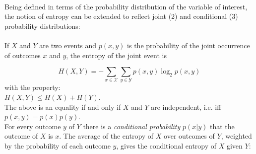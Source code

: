 \documentclass[12pt]{extarticle}
\begin{document}
\noindent \\ Being defined in terms of the probability distribution of the variable of interest, the notion of entropy can be extended to reflect joint (2) and conditional (3) probability distributions:\\ \\
If $X$ and $Y$ are two events and $p(x,y)$ is the probability of the joint occurrence of outcomes $x$ and $y$, the entropy of the joint event is

\begin{equation}
H(X,Y)=-\sum_{x \in \mathcal{X}}\sum_{y \in\mathcal{Y}} p(x,y)\log_2 p(x,y)
\end{equation}
with the property:\\

$H(X,Y)\leq H(X) + H(Y)$.\\

\noindent
The above is an equality if and only if $X$ and $Y$ are independent, i.e. iff $p(x,y)=p(x)p(y)$.\\

\noindent For every outcome $y$ of $Y$ there is a \textit{conditional probability} $p(x|y)$ that the outcome of $X$ is $x$. The average of the entropy of $X$ over outcomes of $Y$, weighted by the probability of each outcome $y$, gives the conditional entropy of $X$ given $Y$:  
\end{document}

